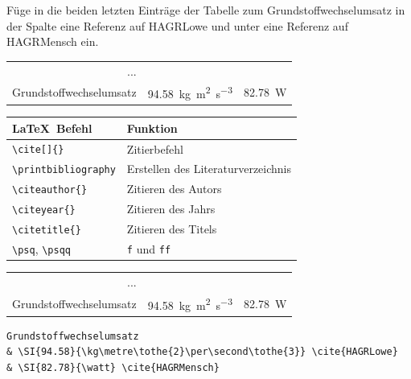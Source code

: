 \documentclass["WS\space 16-17\space -\space LaTeX-Kurs\space -\space Praesentation\space -\space 3.tex"]{subfiles}
\begin{document}
\begin{frame}[fragile]
	\begin{Aufgabe}
		Füge in die beiden letzten Einträge der Tabelle zum Grundstoffwechselumsatz in der Spalte  eine Referenz auf \textrm{HAGRLowe} und unter  eine Referenz auf \textrm{HAGRMensch} ein.
	\end{Aufgabe}
	\begin{outputbox}
		\begin{tabular}{rcc}
			...&&\\
			Grundstoffwechselumsatz	&	\SI{94.58 }{\kg\metre\tothe{2}\per\second\tothe{3}}	\cite{HAGRLowe}		&	\SI{82.78}{\watt}	\cite{HAGRMensch}
		\end{tabular}
	\end{outputbox}
	\btVFill\Befehle
	\begin{center}
		\begin{tabular}{ll}
			\toprule
			\LaTeX\ Befehl							&	Funktion					\\ \midrule
			\lstinline|\cite[]{}|					&	Zitierbefehl\\
			\lstinline|\printbibliography|			&	Erstellen des Literaturverzeichnis\\
			\lstinline|\citeauthor{}|				&	Zitieren des Autors \\
			\lstinline|\citeyear{}|					&	Zitieren des Jahrs \\
			\lstinline|\citetitle{}|				&	Zitieren des Titels \\
			\lstinline|\psq|, \lstinline|\psqq|		&	\texttt{f} und \texttt{ff} \\
			\bottomrule
		\end{tabular}
	\end{center}
	\vspace{0.1cm}
\end{frame}
\begin{frame}[fragile]
	\Losung
	\begin{outputbox}
		\begin{tabular}{rcc}
			...&&\\
			Grundstoffwechselumsatz	&	\SI{94.58 }{\kg\metre\tothe{2}\per\second\tothe{3}}	\cite{HAGRLowe}		&	\SI{82.78}{\watt}	\cite{HAGRMensch}
		\end{tabular}
	\end{outputbox}
	\Code
	\begin{lstlisting}[tabsize=1]
Grundstoffwechselumsatz
& \SI{94.58}{\kg\metre\tothe{2}\per\second\tothe{3}} \cite{HAGRLowe}
& \SI{82.78}{\watt} \cite{HAGRMensch}
	\end{lstlisting}
\end{frame}
\end{document}
